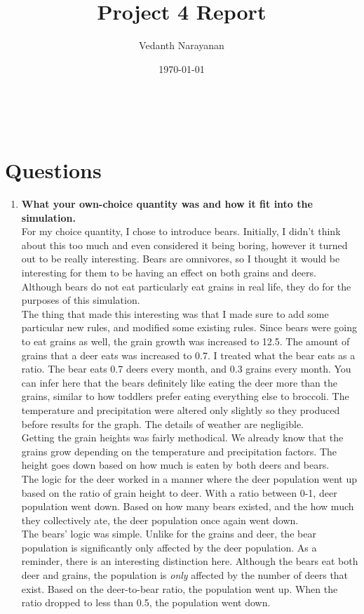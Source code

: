 \documentclass[12pt]{article} %
\title{Project 4 Report}
\author{Vedanth Narayanan}
\date{\today}
\makeatletter
\renewcommand{\maketitle}{ %
	\begin{center} %
		{\LARGE\@title} %
		
		\vspace{15pt} %
		{\large\@author} %
		\\\@date %
		
	\end{center}
}
\makeatother
\begin{document}
	\maketitle
	\section*{Questions}
	\begin{enumerate}
		\item \textbf{What your own-choice quantity was and how it fit into the simulation.}\\
		For my choice quantity, I chose to introduce bears. Initially, I didn't think about this too  much and even considered it being boring, however it turned out to be really interesting. Bears are omnivores, so I thought it would be interesting for them to be having an effect on both grains and deers. Although bears do not eat particularly eat grains in real life, they do for the purposes of this simulation.\\
		The thing that made this interesting was that I made sure to add some particular new rules, and modified some existing rules. Since bears were going to eat grains as well, the grain growth was increased to 12.5. The amount of grains that a deer eats was increased to 0.7. I treated what the bear eats as a ratio. The bear eats 0.7 deers every month, and 0.3 grains every month. You can infer here that the bears definitely like eating the deer more than the grains, similar to how toddlers prefer eating everything else to broccoli. The temperature and precipitation were altered only slightly so they produced before results for the graph. The details of weather are negligible.\\
		Getting the grain heights was fairly methodical. We already know that the grains grow depending on the temperature and precipitation factors. The height goes down based on how much is eaten by both deers and bears.\\
		The logic for the deer worked in a manner where the deer population went up based on the ratio of grain height to deer. With a ratio between 0-1, deer population went down. Based on how many bears existed, and the how much they collectively ate, the deer population once again went down.\\
		The bears' logic was simple. Unlike for the grains and deer, the bear population is significantly only affected by the deer population. As a reminder, there is an interesting distinction here. Although the bears eat both deer and grains, the population is \emph{only} affected by the number of deers that exist. Based on the deer-to-bear ratio, the population went up. When the ratio dropped to less than 0.5, the population went down.

\end{enumerate}
\end{document}

